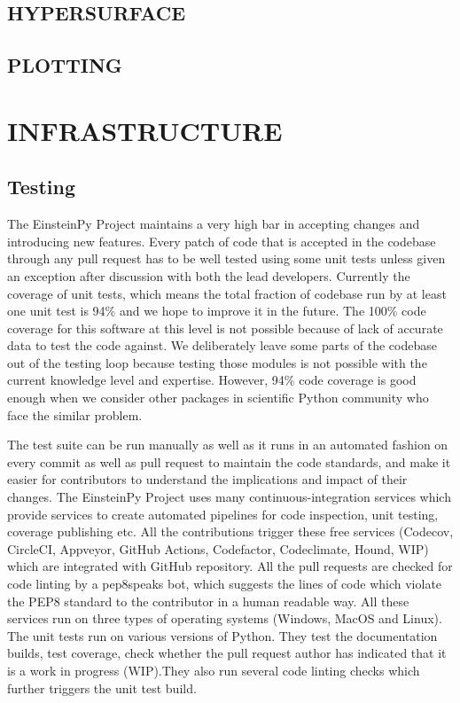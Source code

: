 \documentclass{aastex63}
\begin{document}
\subsection{HYPERSURFACE}
\subsection{PLOTTING}

\section{INFRASTRUCTURE} \label{sec:infra}
\subsection{ Testing} \label{subsec:testing}
The EinsteinPy Project maintains a very high bar in accepting changes and introducing new features. Every patch of code that is accepted in the codebase through any pull request has to be well tested using some unit tests unless given an exception after discussion with both the lead developers. Currently the coverage of unit tests, which means the total fraction of codebase run by at least one unit test is 94\% and we hope to improve it in the future. The 100\% code coverage for this software at this level is not possible because of lack of accurate data to test the code against. We deliberately leave some parts of the codebase out of the testing loop because testing those modules is not possible with the current knowledge level and expertise. However, 94\% code coverage is good enough when we consider other packages in scientific Python community who face the similar problem.  

The test suite can be run manually as well as it runs in an automated fashion on every commit as well as pull request to maintain the code standards, and make it easier for contributors to understand the implications and impact of their changes. The EinsteinPy Project uses many continuous-integration services which provide services to create automated pipelines for code inspection, unit testing, coverage publishing etc. All the contributions trigger these free services (Codecov, CircleCI, Appveyor, GitHub Actions, Codefactor, Codeclimate, Hound, WIP) which are integrated with GitHub repository. All the pull requests are checked for code linting by a pep8speaks bot, which suggests the lines of code which violate the PEP8 standard to the contributor in a human readable way. All these services run on three types of operating systems (Windows, MacOS and Linux). The unit tests run on various versions of Python. They test the documentation builds, test coverage, check whether the pull request author has indicated that it is a work in progress (WIP).They also run several code linting checks which further triggers the unit test build.
\end{document}
